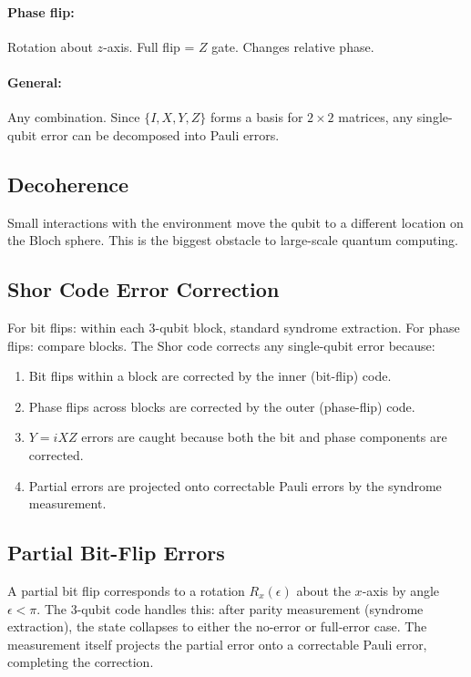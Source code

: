 \documentclass[10pt,a4paper]{article}
\begin{document}
\paragraph{Phase flip:} Rotation about $z$-axis. Full flip = $Z$ gate. Changes relative phase.
\paragraph{General:} Any combination. Since $\{I,X,Y,Z\}$ forms a basis for $2\times 2$ matrices, any single-qubit error can be decomposed into Pauli errors.

\subsection{Decoherence}

Small interactions with the environment move the qubit to a different location on the Bloch sphere. This is the biggest obstacle to large-scale quantum computing.

\subsection{Shor Code Error Correction}

For bit flips: within each 3-qubit block, standard syndrome extraction. For phase flips: compare blocks. The Shor code corrects any single-qubit error because:
\begin{enumerate}[nosep]
\item Bit flips within a block are corrected by the inner (bit-flip) code.
\item Phase flips across blocks are corrected by the outer (phase-flip) code.
\item $Y=iXZ$ errors are caught because both the bit and phase components are corrected.
\item Partial errors are projected onto correctable Pauli errors by the syndrome measurement.
\end{enumerate}

\subsection{Partial Bit-Flip Errors}

A partial bit flip corresponds to a rotation $R_x(\epsilon)$ about the $x$-axis by angle $\epsilon<\pi$. The 3-qubit code handles this: after parity measurement (syndrome extraction), the state collapses to either the no-error or full-error case. The measurement itself projects the partial error onto a correctable Pauli error, completing the correction.
\end{document}
